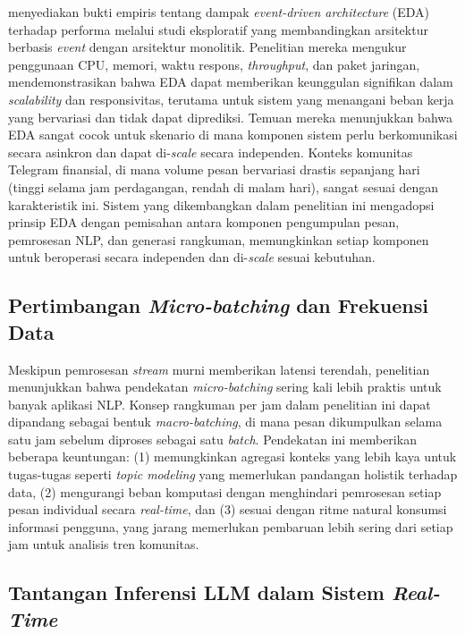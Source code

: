 \textcite{rubert2023} menyediakan bukti empiris tentang dampak \textit{event-driven architecture} (EDA) terhadap performa melalui studi eksploratif yang membandingkan arsitektur berbasis \textit{event} dengan arsitektur monolitik. Penelitian mereka mengukur penggunaan CPU, memori, waktu respons, \textit{throughput}, dan paket jaringan, mendemonstrasikan bahwa EDA dapat memberikan keunggulan signifikan dalam \textit{scalability} dan responsivitas, terutama untuk sistem yang menangani beban kerja yang bervariasi dan tidak dapat diprediksi. Temuan mereka menunjukkan bahwa EDA sangat cocok untuk skenario di mana komponen sistem perlu berkomunikasi secara asinkron dan dapat di-\textit{scale} secara independen. Konteks komunitas Telegram finansial, di mana volume pesan bervariasi drastis sepanjang hari (tinggi selama jam perdagangan, rendah di malam hari), sangat sesuai dengan karakteristik ini. Sistem yang dikembangkan dalam penelitian ini mengadopsi prinsip EDA dengan pemisahan antara komponen pengumpulan pesan, pemrosesan NLP, dan generasi rangkuman, memungkinkan setiap komponen untuk beroperasi secara independen dan di-\textit{scale} sesuai kebutuhan.

\subsection{Pertimbangan \textit{Micro-batching} dan Frekuensi Data}

Meskipun pemrosesan \textit{stream} murni memberikan latensi terendah, penelitian menunjukkan bahwa pendekatan \textit{micro-batching} sering kali lebih praktis untuk banyak aplikasi NLP. Konsep rangkuman per jam dalam penelitian ini dapat dipandang sebagai bentuk \textit{macro-batching}, di mana pesan dikumpulkan selama satu jam sebelum diproses sebagai satu \textit{batch}. Pendekatan ini memberikan beberapa keuntungan: (1) memungkinkan agregasi konteks yang lebih kaya untuk tugas-tugas seperti \textit{topic modeling} yang memerlukan pandangan holistik terhadap data, (2) mengurangi beban komputasi dengan menghindari pemrosesan setiap pesan individual secara \textit{real-time}, dan (3) sesuai dengan ritme natural konsumsi informasi pengguna, yang jarang memerlukan pembaruan lebih sering dari setiap jam untuk analisis tren komunitas.

\subsection{Tantangan Inferensi LLM dalam Sistem \textit{Real-Time}}

